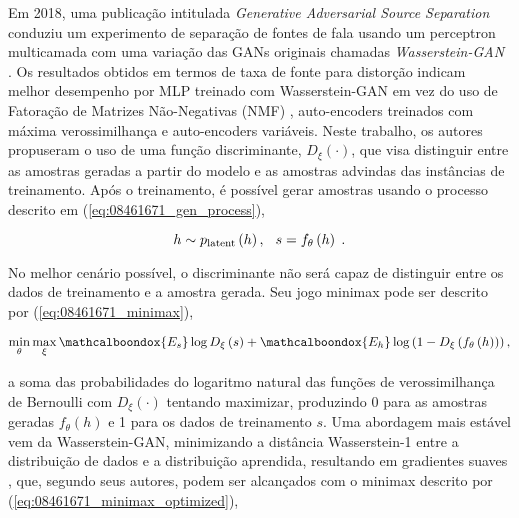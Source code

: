 Em 2018, uma publicação intitulada \textit{Generative Adversarial Source Separation} \citep{8461671} conduziu um experimento de separação de fontes de fala usando um perceptron multicamada com uma variação das GANs originais chamadas \textit{Wasserstein-GAN} \citep{arjovsky2017wasserstein}. Os resultados obtidos em termos de taxa de fonte para distorção indicam melhor desempenho por MLP treinado com Wasserstein-GAN em vez do uso de Fatoração de Matrizes Não-Negativas (NMF) \citep{lee1999learning}, auto-encoders treinados com máxima verossimilhança e auto-encoders variáveis. Neste trabalho, os autores propuseram o uso de uma função discriminante, $D_{\xi}\left(\cdot\right)$, que visa distinguir entre as amostras geradas a partir do modelo e as amostras advindas das instâncias de treinamento. Após o treinamento, é possível gerar amostras usando o processo descrito em (\ref{eq:08461671_gen_process}),

\begin{equation}
    h\sim p_{\text{latent}}\left(h\right), \hspace{0.25cm} s = f_{\theta}\left(h\right) \hspace{0.10cm}.
    \label{eq:08461671_gen_process}
    \vspace{0.2cm}
\end{equation}

No melhor cenário possível, o discriminante não será capaz de distinguir entre os dados de treinamento e a amostra gerada. Seu jogo minimax pode ser descrito por (\ref{eq:08461671_minimax}),

\begin{equation}
    \min_{\theta}\max_{\xi}\mathcalboondox{E_{s}}\log D_{\xi}\left(s\right) + \mathcalboondox{E_{h}}\log \left(1-D_{\xi}\left(f_{\theta}\left(h\right)\right)\right),
    \label{eq:08461671_minimax}
    \vspace{0.2cm}
\end{equation}

\noindent a soma das probabilidades do logaritmo natural das funções de verossimilhança de Bernoulli com $D_ {\xi}\left(\cdot\right)$ tentando maximizar, produzindo 0 para as amostras geradas $f_{\theta}\left(h\right)$ e 1 para os dados de treinamento $s$. Uma abordagem mais estável vem da Wasserstein-GAN, minimizando a distância Wasserstein-1 \citep{OLKIN1982257} entre a distribuição de dados e a distribuição aprendida, resultando em gradientes suaves \citep{arjovsky2017wasserstein}, que, segundo seus autores, podem ser alcançados com o minimax descrito por (\ref{eq:08461671_minimax_optimized}),

